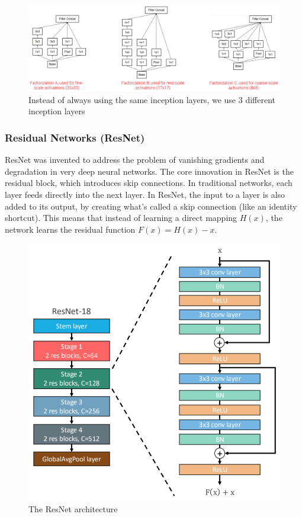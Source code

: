 \begin{figure}[htbp]
  \centering
  \includegraphics[width=0.8\linewidth]{./img/inception3.png}
  \caption{Instead of always using the same inception layers, we use 3 different inception layers}
\end{figure}

\subsubsection{Residual Networks (ResNet)}
ResNet was invented to address the problem of vanishing gradients and degradation in very deep neural networks.
The core innovation in ResNet is the residual block, which introduces skip connections.
In traditional networks, each layer feeds directly into the next layer.
In ResNet, the input to a layer is also added to its output, by creating what's called a skip connection (like an identity shortcut).
This means that instead of learning a direct mapping $H(x)$, the network learns the residual function $F(x) = H(x) - x$.

\begin{figure}[htbp]
  \centering
  \includegraphics[width=0.8\linewidth]{./img/resnet.png}
  \caption{The ResNet architecture}
\end{figure}

